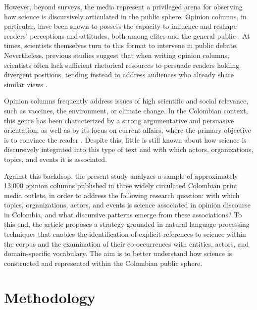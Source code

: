\documentclass[pdflatex,sn-mathphys-num, iicol]{sn-jnl}
\begin{document}
	However, beyond surveys, the media represent a privileged arena for observing how science is discursively articulated in the public sphere. Opinion columns, in particular, have been shown to possess the capacity to influence and reshape readers’ perceptions and attitudes, both among elites and the general public \cite{Coppock2018}. At times, scientists themselves turn to this format to intervene in public debate. Nevertheless, previous studies suggest that when writing opinion columns, scientists often lack sufficient rhetorical resources to persuade readers holding divergent positions, tending instead to address audiences who already share similar views \cite{Syfert2025}.
	
	Opinion columns frequently address issues of high scientific and social relevance, such as vaccines, the environment, or climate change. In the Colombian context, this genre has been characterized by a strong argumentative and persuasive orientation, as well as by its focus on current affairs, where the primary objective is to convince the reader \cite{CaroLopera2020}. Despite this, little is still known about how science is discursively integrated into this type of text and with which actors, organizations, topics, and events it is associated.


	Against this backdrop, the present study analyzes a sample of approximately 13,000 opinion columns published in three widely circulated Colombian print media outlets, in order to address the following research question: with which topics, organizations, actors, and events is science associated in opinion discourse in Colombia, and what discursive patterns emerge from these associations? To this end, the article proposes a strategy grounded in natural language processing techniques that enables the identification of explicit references to science within the corpus and the examination of their co-occurrences with entities, actors, and domain-specific vocabulary. The aim is to better understand how science is constructed and represented within the Colombian public sphere.
	
	\section{Methodology}\label{sec:methodology}
	
\end{document}
